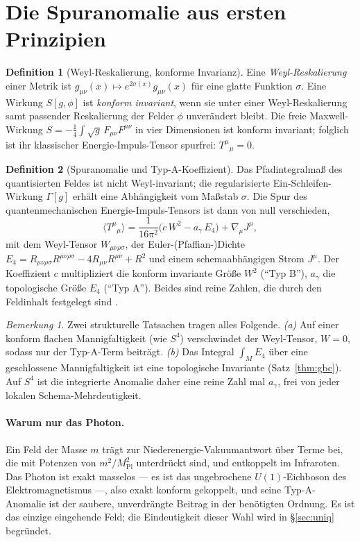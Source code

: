 \documentclass[11pt,a4paper]{article}
\theoremstyle{definition}
\newtheorem{definition}{Definition}
\theoremstyle{remark}
\newtheorem{remark}{Bemerkung}
\newcommand{\ag}{a_\gamma}
\newcommand{\Mpl}{M_{\mathrm{Pl}}}
\newcommand{\avg}[1]{\langle #1\rangle}
\begin{document}
\section{Die Spuranomalie aus ersten Prinzipien}\label{sec:anomaly}
\begin{definition}[Weyl-Reskalierung, konforme Invarianz]
Eine \emph{Weyl-Reskalierung} einer Metrik ist $g_{\mu\nu}(x)\mapsto e^{2\sigma(x)}g_{\mu\nu}(x)$
für eine glatte Funktion $\sigma$. Eine Wirkung $S[g,\phi]$ ist \emph{konform invariant}, wenn sie
unter einer Weyl-Reskalierung samt passender Reskalierung der Felder $\phi$ unverändert bleibt. Die
freie Maxwell-Wirkung $S=-\tfrac14\int\sqrt g\,F_{\mu\nu}F^{\mu\nu}$ in vier Dimensionen ist konform
invariant; folglich ist ihr klassischer Energie-Impuls-Tensor spurfrei: $T^\mu{}_\mu=0$.
\end{definition}

\begin{definition}[Spuranomalie und Typ-A-Koeffizient]
Das Pfadintegralmaß des quantisierten Feldes ist nicht Weyl-invariant; die regularisierte
Ein-Schleifen-Wirkung $\Gamma[g]$ erhält eine Abhängigkeit vom Maßstab $\sigma$. Die Spur des
quantenmechanischen Energie-Impuls-Tensors ist dann von null verschieden,
\begin{equation}\label{eq:anomaly}
\avg{T^\mu{}_\mu}=\frac{1}{16\pi^2}\bigl(c\,W^2-\ag\,E_4\bigr)+\nabla_\mu J^\mu,
\end{equation}
mit dem Weyl-Tensor $W_{\mu\nu\rho\sigma}$, der Euler-(Pfaffian-)Dichte
$E_4=R_{\mu\nu\rho\sigma}R^{\mu\nu\rho\sigma}-4R_{\mu\nu}R^{\mu\nu}+R^2$ und einem
schemaabhängigen Strom $J^\mu$. Der Koeffizient $c$ multipliziert die konform invariante Größe
$W^2$ (``Typ B''), $\ag$ die topologische Größe $E_4$ (``Typ A''). Beides sind reine Zahlen, die
durch den Feldinhalt festgelegt sind \cite{DeserSchwimmer,Duff1994}.
\end{definition}

\begin{remark}\label{rem:why}
Zwei strukturelle Tatsachen tragen alles Folgende. \emph{(a)} Auf einer konform flachen
Mannigfaltigkeit (wie $S^4$) verschwindet der Weyl-Tensor, $W=0$, sodass nur der Typ-A-Term
beiträgt. \emph{(b)} Das Integral $\int_M E_4$ über eine geschlossene Mannigfaltigkeit ist eine
topologische Invariante (Satz~\ref{thm:gbc}). Auf $S^4$ ist die integrierte Anomalie daher eine
reine Zahl mal $\ag$, frei von jeder lokalen Schema-Mehrdeutigkeit.
\end{remark}

\paragraph{Warum nur das Photon.} Ein Feld der Masse $m$ trägt zur Niederenergie-Vakuumantwort über
Terme bei, die mit Potenzen von $m^2/\Mpl^2$ unterdrückt sind, und entkoppelt im Infraroten. Das
Photon ist exakt masselos --- es ist das ungebrochene $U(1)$-Eichboson des Elektromagnetismus ---,
also exakt konform gekoppelt, und seine Typ-A-Anomalie ist der saubere, unverdrängte Beitrag in der
benötigten Ordnung. Es ist das einzige eingehende Feld; die Eindeutigkeit dieser Wahl wird in
\S\ref{sec:uniq} begründet.
\end{document}
